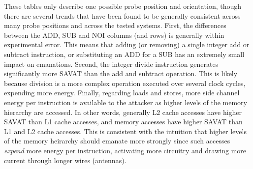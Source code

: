 These tables only describe one possible probe position and orientation, though there are several trends that have been found to be generally consistent across many probe positions and across the tested systems. First, the differences between the ADD, SUB and NOI columns (and rows) is generally within experimental error. This means that adding (or removing) a single integer add or subtract instruction, or substituting an ADD for a SUB has an extremely small impact on emanations. Second, the integer divide instruction generates significantly more SAVAT than the add and subtract operation. This is likely because division is a more complex operation executed over several clock cycles, expending more energy. Finally, regarding loads and stores, more side channel energy per instruction is available to the attacker as higher levels of the memory hierarchy are accessed. In other words, generally L2 cache accesses have higher SAVAT than L1 cache accesses, and memory accesses have higher SAVAT than L1 and L2 cache accesses. This is consistent with the intuition that higher levels of the memory heirarchy should emanate more strongly since such accesses {\it expend} more energy per instruction, activating more circuitry and drawing more current through longer wires (antennas). %
